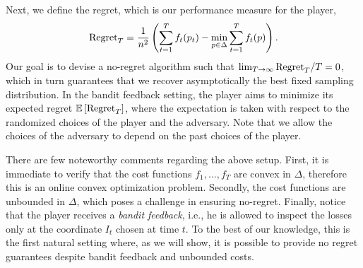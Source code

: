 Next, we define the regret, which is our performance measure for the player,
\begin{equation*}
\text{Regret}_T =  \frac{1}{n^2}\left(\sum_{t=1}^Tf_t(p_t) - \min_{p\in \Delta}\sum_{t=1}^T f_t(p) \right).
\end{equation*}
Our goal is to devise a no-regret algorithm such that $\lim_{T \rightarrow \infty} \text{Regret}_T / T = 0$, which in turn guarantees that we  recover asymptotically the best fixed sampling distribution. 
In the bandit feedback setting, the player aims to minimize its expected regret $\mathbb{E}\left[ \text{Regret}_T \right]$, 
where the expectation is taken with respect to the randomized choices of the player and the adversary. Note that we  allow the choices of the adversary to depend on the past choices of the player. 


There are few noteworthy comments regarding the above setup. First, it is immediate to verify that the cost functions $f_1, \dots,  f_T$ are convex in $\Delta$, therefore this is an online convex optimization problem. 
Secondly, the cost functions are unbounded in $\Delta$, which poses a challenge in ensuring no-regret.
Finally, notice that the player  receives a \emph{bandit feedback}, i.e., he is allowed to inspect the losses only at the coordinate $I_t$
 chosen at time $t$. To the best of our knowledge, this is the first natural setting
 where, as we will show, it is possible to provide no regret guarantees despite bandit feedback and unbounded costs.







